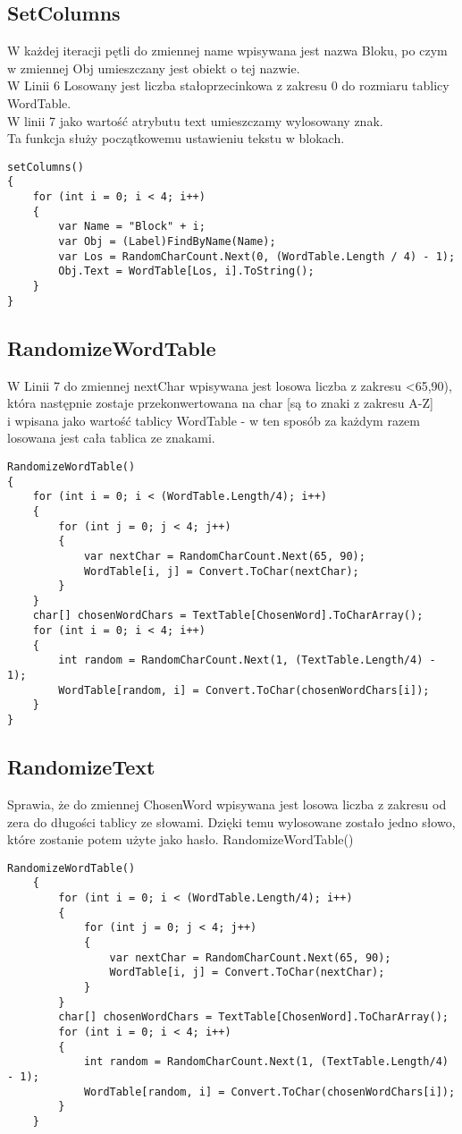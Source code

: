 \subsection{SetColumns}
\hspace{0.60cm}W każdej iteracji pętli do zmiennej name wpisywana jest nazwa Bloku, po czym w zmiennej Obj umieszczany jest obiekt o tej nazwie.
\\W Linii 6 Losowany jest liczba stałoprzecinkowa z zakresu 0 do rozmiaru tablicy WordTable.
\\W linii 7 jako wartość atrybutu text umieszczamy wylosowany znak.
\\Ta funkcja służy początkowemu ustawieniu tekstu w blokach.
\begin{lstlisting}[caption=SetColums]
setColumns()
{
	for (int i = 0; i < 4; i++)
	{
		var Name = "Block" + i;
		var Obj = (Label)FindByName(Name);
		var Los = RandomCharCount.Next(0, (WordTable.Length / 4) - 1);
		Obj.Text = WordTable[Los, i].ToString();
	}
}
\end{lstlisting}

\subsection{RandomizeWordTable}
\hspace{0.60cm}W Linii 7 do zmiennej nextChar wpisywana jest losowa liczba z zakresu <65,90), która następnie zostaje przekonwertowana na char [są to znaki z zakresu A-Z] \\i wpisana jako wartość tablicy WordTable - w ten sposób za każdym razem losowana jest cała tablica ze znakami.
\begin{lstlisting}[caption=RandomizeWordTable]
RandomizeWordTable()
{
	for (int i = 0; i < (WordTable.Length/4); i++)
	{
		for (int j = 0; j < 4; j++)
		{
			var nextChar = RandomCharCount.Next(65, 90);
			WordTable[i, j] = Convert.ToChar(nextChar);
		}
	}
	char[] chosenWordChars = TextTable[ChosenWord].ToCharArray();
	for (int i = 0; i < 4; i++)
	{
		int random = RandomCharCount.Next(1, (TextTable.Length/4) - 1);
		WordTable[random, i] = Convert.ToChar(chosenWordChars[i]);
	}
}	
\end{lstlisting}

\subsection{RandomizeText}
\hspace{0.60cm}Sprawia, że do zmiennej ChosenWord wpisywana jest losowa liczba z zakresu od zera do długości tablicy ze słowami. Dzięki temu wylosowane zostało jedno słowo, które zostanie potem użyte jako hasło.
RandomizeWordTable()
\begin{lstlisting}[caption=RandomizeText]
	RandomizeWordTable()
	{
		for (int i = 0; i < (WordTable.Length/4); i++)
		{
			for (int j = 0; j < 4; j++)
			{
				var nextChar = RandomCharCount.Next(65, 90);
				WordTable[i, j] = Convert.ToChar(nextChar);
			}
		}
		char[] chosenWordChars = TextTable[ChosenWord].ToCharArray();
		for (int i = 0; i < 4; i++)
		{
			int random = RandomCharCount.Next(1, (TextTable.Length/4) - 1);
			WordTable[random, i] = Convert.ToChar(chosenWordChars[i]);
		}
	}	
\end{lstlisting}

